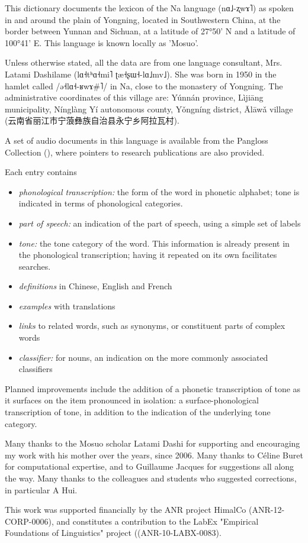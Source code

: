 \documentclass[oldfontcommands,oneside,a4paper,11pt]{article}
\newcommand{\ipa}[1]{{\phon #1}} %
\newcommand{\zh}[1]{{\cn #1}}
\begin{document}
 
This dictionary documents the lexicon of the Na language (\ipa{nɑ˩-ʐwɤ˥}) as spoken in and around the plain of Yongning, located in Southwestern China, at the border between Yunnan and Sichuan, at a latitude of 27°50’ N and a latitude of 100°41’ E. This language is known locally as 'Mosuo'. 

Unless otherwise stated, all the data are from one language consultant, Mrs. Latami Dashilame (\ipa{lɑ˧tʰɑ˧mi˥ ʈæ˧ʂɯ˧-lɑ˩mv˩}). She was born in 1950 in the hamlet called /\ipa{ə˧lɑ˧-ʁwɤ\#˥}/ in Na, close to the monastery of Yongning. The administrative coordinates of this village are: Yúnnán province, Lìjiāng municipality, Nínglàng Yí autonomous county, Yǒngníng district, Ālāwǎ village (\zh{云南省丽江市宁蒗彝族自治县永宁乡阿拉瓦村}). 

A set of audio documents in this language is available from the Pangloss Collection (\citealt{michailovsky14pangloss}), where pointers to research publications are also provided.
 
Each entry contains
\begin{itemize}
	\item \textit{phonological transcription:} the form of the word in phonetic alphabet; tone is indicated in terms of phonological categories. 
	\item \textit{part of speech:} an indication of the part of speech, using a simple set of labels
	\item \textit{tone:} the tone category of the word. This information is already present in the phonological transcription; having it repeated on its own facilitates searches.
	\item \textit{definitions} in Chinese, English and French
	\item \textit{examples} with translations
	\item \textit{links} to related words, such as synonyms, or constituent parts of complex words 
	\item \textit{classifier:} for nouns, an indication on the more commonly associated classifiers
\end{itemize}

Planned improvements include the addition of a phonetic transcription of tone as it surfaces on the item pronounced in isolation: a surface-phonological transcription of tone, in addition to the indication of the underlying tone category. 

Many thanks to the Mosuo scholar Latami Dashi for supporting and encouraging my work with his mother over the years, since 2006. Many thanks to Céline Buret for computational expertise, and to Guillaume Jacques for suggestions all along the way. Many thanks to the colleagues and students who suggested corrections, in particular A Hui.

This work was supported financially by the ANR project HimalCo (ANR-12-CORP-0006), and constitutes a contribution to the LabEx "Empirical Foundations of Linguistics" project ((ANR-10-LABX-0083).



\end{document}
